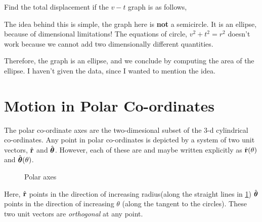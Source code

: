 \begin{example}
    Find the total displacement if the \(v-t\) graph is as follows,
    \begin{figure}
        [H]
        \centering
    \end{figure}
    The idea behind this is simple, the graph here is \textbf{not} a semicircle. It is an
    ellipse, because of dimensional limitations! The equations of circle, \(v^2 + t^2 = r^2\)
    doesn't work because we cannot add two dimensionally different quantities.

    Therefore, the graph is an ellipse, and we conclude by computing the area of the ellipse. I haven't
    given the data, since I wanted to mention the idea.
\end{example}

\section{Motion in Polar Co-ordinates}

The polar co-ordinate axes are the two-dimesional subset of the 3-d cylindrical co-ordinates. 
Any point in polar co-ordinates is depicted by a system of two unit vectors, \({\hat{\boldsymbol{\mathbf{r}}}}\) and
\({\hat{\boldsymbol{\mathbf{\theta}}}}\). However, each of these are  and
maybe written explicitly as \({\hat{\boldsymbol{\mathbf{r}}}}(\theta)\) and \({\hat{\boldsymbol{\mathbf{\theta}}}}(\theta)\).  

\begin{figure}
    [H]
    \centering
    \caption{Polar axes}
    \label{fig: polar}
\end{figure}

Here, \({\hat{\boldsymbol{\mathbf{r}}}}\) points in the direction of increasing radius(along the straight lines in \cref{fig: polar})
\({\hat{\boldsymbol{\mathbf{\theta}}}}\) points in the direction of increasing \(\theta\) (along the tangent to the circles).
These two unit vectors are \emph{orthogonal} at any point. 

